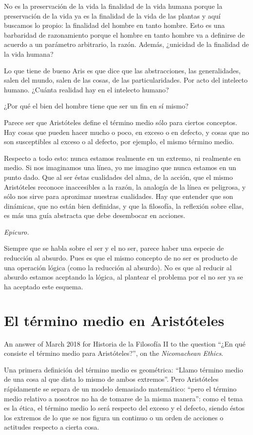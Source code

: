 No es la preservación de la vida la finalidad
de la vida humana porque la preservación de
la vida ya es la finalidad de la vida de las
plantas y aquí buscamos lo propio: la
finalidad del hombre en tanto hombre. Esto es
una barbaridad de razonamiento porque el
hombre en tanto hombre va a definirse de
acuerdo a un parámetro arbitrario, la razón.
Además, ¿unicidad de la finalidad de la vida
humana?

Lo que tiene de bueno Aris es que dice que
las abstracciones, las generalidades, salen
del mundo, salen de las cosas, de las
particularidades. Por acto del intelecto
humano. ¿Cuánta realidad hay en el intelecto
humano?

¿Por qué el bien del hombre tiene que ser un
fin en sí mismo?

Parece ser que Aristóteles define el término
medio sólo para ciertos conceptos. Hay cosas
que pueden hacer mucho o poco, en exceso o en
defecto, y cosas que no son susceptibles al
exceso o al defecto, por ejemplo, el mismo
término medio.

Respecto a todo esto: nunca estamos realmente
en un extremo, ni realmente en medio. Si nos
imaginamos una línea, yo me imagino que nunca
estamos en un punto dado. Que al ser éstas
cualidades del alma, de la acción, que el
mismo Aristóteles reconoce inaccesibles a la
razón, la analogía de la línea es peligrosa,
y sólo nos sirve para aproximar nuestras
cualidades. Hay que entender que son
dinámicas, que no están bien definidas, y que
la filosofía, la reflexión sobre ellas, es
más una guía abstracta que debe desembocar en
acciones.

\medskip\noindent\emph{Epicuro.}

Siempre que se habla sobre el ser y el no
ser, parece haber una especie de reducción al
absurdo. Pues es que el mismo concepto de no
ser es producto de una operación lógica (como
la reducción al absurdo). No es que al
reducir al absurdo estamos aceptando la
lógica, al plantear el problema por el no ser
ya se ha aceptado este esquema.

\section{El término medio en Aristóteles}
\label{section-termino-medio}

An answer of March 2018 for Historia de la
Filosofía II to the question ``¿En qué
consiste el término medio para
Aristóteles?'', on the
\emph{Nicomachean Ethics}.

Una primera definición del término medio es
geométrica: ``Llamo término medio de una cosa
al que dista lo mismo de ambos extremos''.
Pero Aristóteles rápidamente se separa de un
modelo demasiado matemático: ``pero el
término medio relativo a nosotros no ha de
tomarse de la misma manera'': como el tema es
la ética, el término medio lo será respecto
del exceso y el defecto, siendo éstos los
extremos de lo que se nos figura un continuo
o un orden de acciones o actitudes respecto a
cierta cosa.

